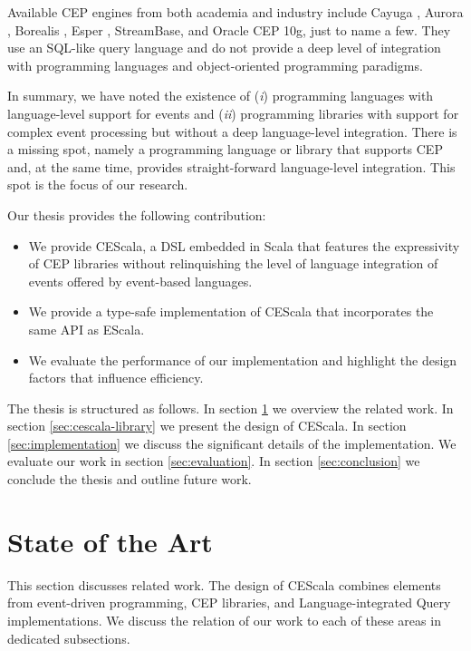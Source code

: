 \documentclass[book,type=bsc,colorback,accentcolor=tud8b,12pt,twoside]{tudthesis}
\begin{document}
Available CEP engines from both academia and industry include Cayuga \cite{Demers:2007wj}, Aurora \cite{Abadi:2003kv}, Borealis \cite{Abadi:2005uy}, Esper \cite{Esper}, StreamBase, and Oracle CEP 10g, just to name a few.  They use an SQL-like query language and do not provide a deep level of integration with programming languages and object-oriented programming paradigms.  

In summary, we have noted the existence of (\emph{i}) programming languages with language-level support for events and (\emph{ii}) programming libraries with support for complex event processing but without a deep language-level integration.  There is a missing spot, namely a programming language or library that supports CEP and, at the same time, provides straight-forward language-level integration.  This spot is the focus of our research.  

Our thesis provides the following contribution:

\begin{itemize}

\item We provide CEScala, a DSL embedded in Scala that features the expressivity of CEP libraries without relinquishing the level of language integration of events offered by event-based languages.  

\item We provide a type-safe implementation of CEScala that incorporates the same API as \mbox{EScala}.  
  
\item We evaluate the performance of our implementation and highlight the design factors that influence efficiency.  

\end{itemize}

The thesis is structured as follows. In section \ref{sec:state-of-the-art} we overview the related work. In section \ref{sec:cescala-library} we present the design of CEScala. In section \ref{sec:implementation} we discuss the significant details of the implementation. We evaluate our work in section \ref{sec:evaluation}. In section \ref{sec:conclusion} we conclude the thesis and outline future work.

\chapter{State of the Art}
\label{sec:state-of-the-art}

This section discusses related work.  The design of CEScala combines elements from event-driven programming, CEP libraries, and Language-integrated Query implementations.  We discuss the relation of our work to each of these areas in dedicated subsections.  
\end{document}
